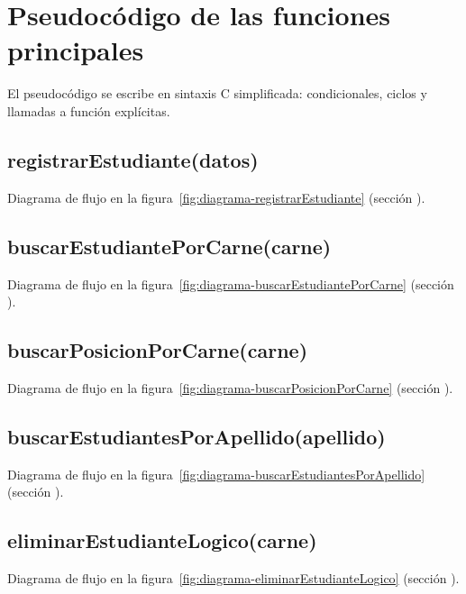 \section{Pseudocódigo de las funciones principales}
\label{sec:pseudocodigo}

El pseudocódigo se escribe en sintaxis C simplificada: condicionales,
ciclos y llamadas a función explícitas.

\subsection{registrarEstudiante(datos)}


Diagrama de flujo en la figura~\ref{fig:diagrama-registrarEstudiante} (sección ).

\subsection{buscarEstudiantePorCarne(carne)}


Diagrama de flujo en la figura~\ref{fig:diagrama-buscarEstudiantePorCarne} (sección ).

\subsection{buscarPosicionPorCarne(carne)}


Diagrama de flujo en la figura~\ref{fig:diagrama-buscarPosicionPorCarne} (sección ).

\subsection{buscarEstudiantesPorApellido(apellido)}


Diagrama de flujo en la figura~\ref{fig:diagrama-buscarEstudiantesPorApellido} (sección ).

\subsection{eliminarEstudianteLogico(carne)}


Diagrama de flujo en la figura~\ref{fig:diagrama-eliminarEstudianteLogico} (sección ).

